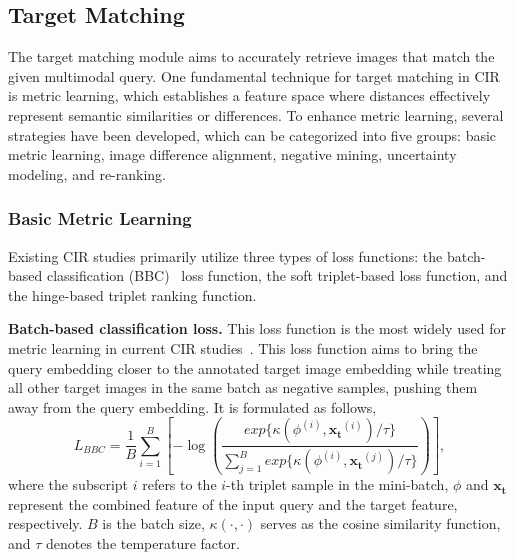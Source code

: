 \subsection{Target Matching}
The target matching module aims to accurately retrieve images that match the given multimodal query. One fundamental technique for target matching in CIR is metric learning, which establishes a feature space where distances effectively represent semantic similarities or differences. To enhance metric learning, several strategies have been developed, which can be categorized into five groups: basic metric learning, image difference alignment, negative mining, uncertainty modeling, and re-ranking. 

\subsubsection{Basic Metric Learning}
Existing CIR studies primarily utilize three types of loss functions: the batch-based classification (BBC)~\cite{vo2019tirg} loss function, the soft triplet-based loss function, and the hinge-based triplet ranking function.

\textbf{Batch-based classification loss.} This loss function is the most widely used for metric learning in current CIR studies~\cite{vo2019tirg,hosseinzadeh2020lbf,kim2021dcnet,baldrati2022CLIP4CIR,wen2023tgcir,levy2024case,yang2024ssn,jiang2024cala,yan2024shaf,huang2023lgli,xusentence2024sprc,shin2021rtic,zhang2022eer,huang2022ga,li2023acnet,baldrati2023CLIP4CIR2,baldrati2022Combiner}. This loss function aims to bring the query embedding closer to the annotated target image embedding while treating all other target images in the same batch as negative samples, pushing them away from the query embedding.
It is formulated as follows, 
\begin{equation}
L_{BBC} = \frac{1}{B} \sum_{i=1}^{B}\left[ -\log \left(\frac {exp\{\kappa({\phi}^{(i)}, \mathbf{x_t}^{(i)}) /\tau \}}{\sum_{j=1}^{B}exp\{\kappa({\phi}^{(i)} , \mathbf{x_t}^{(j)} ) /\tau \}} \right) \right], 
\label{eq:bbc_loss}
\end{equation}
where the subscript $i$ refers to the $i$-th triplet sample in the mini-batch, ${\phi}$ and $\mathbf{x_t}$ represent the combined feature of the input query and the target feature, respectively. $B$ is the batch size, $\kappa\left( \cdot, \cdot \right)$ serves as the cosine similarity function, and $\tau$ denotes the temperature factor. 

